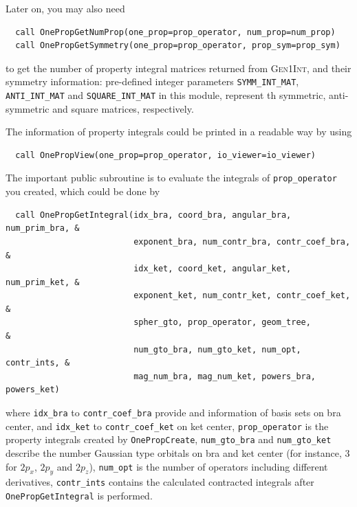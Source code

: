 \documentclass[a4paper,11pt,twoside,openright]{book}
\begin{document}
Later on, you may also need
\begin{verbatim}
  call OnePropGetNumProp(one_prop=prop_operator, num_prop=num_prop)
  call OnePropGetSymmetry(one_prop=prop_operator, prop_sym=prop_sym)
\end{verbatim}
to get the number of property integral matrices returned from \textsc{Gen1Int}, and their symmetry
information: pre-defined integer parameters \verb|SYMM_INT_MAT|,
\verb|ANTI_INT_MAT| and
\verb|SQUARE_INT_MAT| in this module,
represent th symmetric, anti-symmetric and square matrices, respectively.

The information of property integrals could be printed in a readable way by using
\begin{verbatim}
  call OnePropView(one_prop=prop_operator, io_viewer=io_viewer)
\end{verbatim}

The important public subroutine is to evaluate the integrals of \verb|prop_operator| you created,
which could be done by
\begin{verbatim}
  call OnePropGetIntegral(idx_bra, coord_bra, angular_bra, num_prim_bra, &
                          exponent_bra, num_contr_bra, contr_coef_bra,   &
                          idx_ket, coord_ket, angular_ket, num_prim_ket, &
                          exponent_ket, num_contr_ket, contr_coef_ket,   &
                          spher_gto, prop_operator, geom_tree,           &
                          num_gto_bra, num_gto_ket, num_opt, contr_ints, &
                          mag_num_bra, mag_num_ket, powers_bra, powers_ket)
\end{verbatim}
where \verb|idx_bra| to \verb|contr_coef_bra| provide and information of basis sets on bra center,
and \verb|idx_ket| to \verb|contr_coef_ket| on ket center, \verb|prop_operator| is the property integrals
created by \verb|OnePropCreate|, \verb|num_gto_bra| and \verb|num_gto_ket| describe the number
Gaussian type orbitals on bra and ket center (for instance, 3 for $2p_{x}$, $2p_{y}$ and $2p_{z}$),
\verb|num_opt| is the number of operators including different derivatives, \verb|contr_ints| contains
the calculated contracted integrals after \verb|OnePropGetIntegral| is performed.
\end{document}
